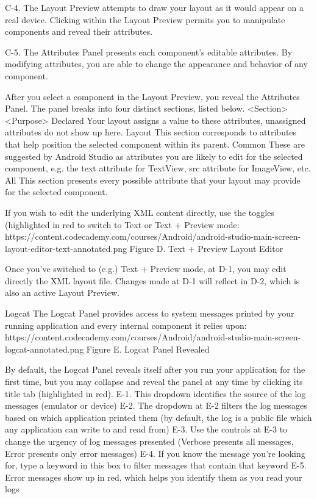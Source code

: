             C-4. The Layout Preview attempts to draw your layout as it would appear on a real device. Clicking within the Layout Preview permits you to manipulate components and reveal their attributes.

            C-5. The Attributes Panel presents each component’s editable attributes. By modifying attributes, you are able to change the appearance and behavior of any component.

        After you select a component in the Layout Preview, you reveal the Attributes Panel. The panel breaks into four distinct sections, listed below.
            <Section>	        <Purpose>
                Declared	    Your layout assigns a value to these attributes, unassigned attributes do not show up here.
                Layout	        This section corresponds to attributes that help position the selected component within its parent.
                Common	        These are suggested by Android Studio as attributes you are likely to edit for the selected component, e.g. the text attribute for TextView, src attribute for ImageView, etc.
                All	            This section presents every possible attribute that your layout may provide for the selected component.

        If you wish to edit the underlying XML content directly, use the toggles (highlighted in red to switch to Text or Text + Preview mode:
            🎨https://content.codecademy.com/courses/Android/android-studio-main-screen-layout-editor-text-annotated.png
                Figure D. Text + Preview Layout Editor

        Once you’ve switched to (e.g.) Text + Preview mode, at D-1, you may edit directly the XML layout file. Changes made at D-1 will reflect in D-2, which is also an active Layout Preview.

    Logcat
        The Logcat Panel provides access to system messages printed by your running application and every internal component it relies upon:
            🎨https://content.codecademy.com/courses/Android/android-studio-main-screen-logcat-annotated.png
                Figure E. Logcat Panel Revealed

        By default, the Logcat Panel reveals itself after you run your application for the first time, but you may collapse and reveal the panel at any time by clicking its title tab (highlighted in red).
            E-1. This dropdown identifies the source of the log messages (emulator or device)
            E-2. The dropdown at E-2 filters the log messages based on which application printed them (by default, the log is a public file which any application can write to and read from)
            E-3. Use the controls at E-3 to change the urgency of log messages presented (Verbose presents all messages, Error presents only error messages)
            E-4. If you know the message you’re looking for, type a keyword in this box to filter messages that contain that keyword
            E-5. Error messages show up in red, which helps you identify them as you read your logs
            
